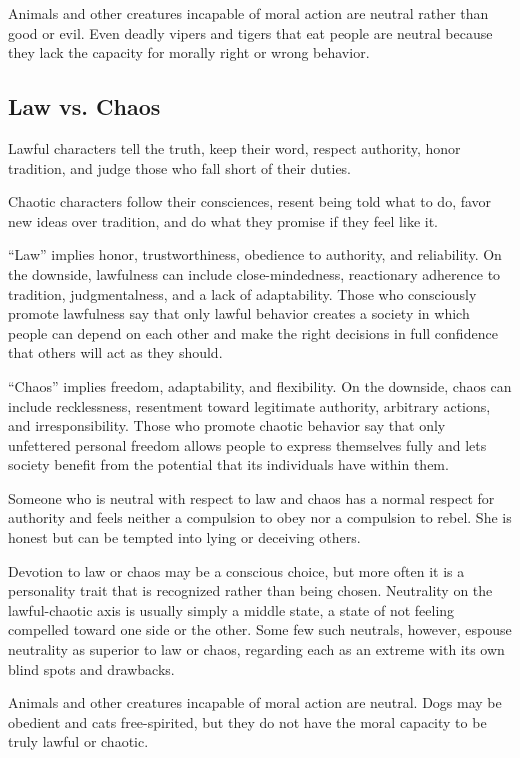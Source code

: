         Animals and other creatures incapable of moral action are neutral rather than good or evil. Even deadly vipers and tigers that eat people are neutral because they lack the capacity for morally right or wrong behavior.

    \subsection{Law vs. Chaos}
        Lawful characters tell the truth, keep their word, respect authority, honor tradition, and judge those who fall short of their duties.

        Chaotic characters follow their consciences, resent being told what to do, favor new ideas over tradition, and do what they promise if they feel like it.

        ``Law'' implies honor, trustworthiness, obedience to authority, and reliability. On the downside, lawfulness can include close-mindedness, reactionary adherence to tradition, judgmentalness, and a lack of adaptability. Those who consciously promote lawfulness say that only lawful behavior creates a society in which people can depend on each other and make the right decisions in full confidence that others will act as they should.

        ``Chaos'' implies freedom, adaptability, and flexibility. On the downside, chaos can include recklessness, resentment toward legitimate authority, arbitrary actions, and irresponsibility. Those who promote chaotic behavior say that only unfettered personal freedom allows people to express themselves fully and lets society benefit from the potential that its individuals have within them.

        Someone who is neutral with respect to law and chaos has a normal respect for authority and feels neither a compulsion to obey nor a compulsion to rebel. She is honest but can be tempted into lying or deceiving others.

        Devotion to law or chaos may be a conscious choice, but more often it is a personality trait that is recognized rather than being chosen. Neutrality on the lawful-chaotic axis is usually simply a middle state, a state of not feeling compelled toward one side or the other. Some few such neutrals, however, espouse neutrality as superior to law or chaos, regarding each as an extreme with its own blind spots and drawbacks.

        Animals and other creatures incapable of moral action are neutral. Dogs may be obedient and cats free-spirited, but they do not have the moral capacity to be truly lawful or chaotic.

